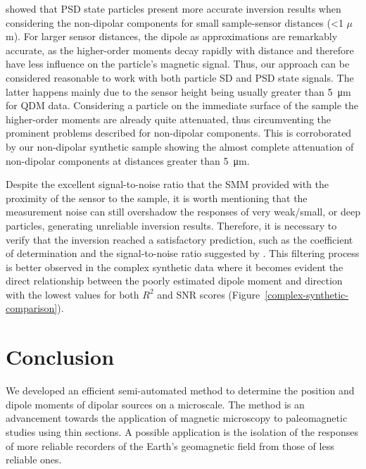 \cite{CortesOrtuno2022} showed that PSD state particles present more accurate inversion results when considering the non-dipolar components for small sample-sensor distances (\textless 1 $\mu$m). For larger sensor distances, the dipole as approximations are remarkably accurate, as the higher-order moments decay rapidly with distance and therefore have less
influence on the particle's magnetic signal.
Thus, our approach can be considered reasonable to work with both particle SD and PSD state signals.
The latter happens mainly due to the sensor height being usually greater than \qty{5}{\um} for QDM data. Considering a particle on the immediate surface of the sample the higher-order moments are already quite attenuated, thus circumventing the prominent problems described for non-dipolar components. This is corroborated by our non-dipolar synthetic sample showing the almost complete attenuation of non-dipolar components at distances greater than \qty{5}{\um}.

Despite the excellent signal-to-noise ratio that the SMM provided with the
proximity of the sensor to the sample, it is worth mentioning that the
measurement noise can still overshadow the responses of very weak/small, or
deep particles, generating unreliable inversion results.
Therefore, it is necessary to verify that the inversion reached a satisfactory prediction, such as the coefficient of determination \citep[dipolarity test, ][]{Fu2020} and the
signal-to-noise ratio suggested by \cite{CortesOrtuno2021}. This filtering process is better observed in the complex synthetic data where it becomes evident the direct relationship between the poorly estimated dipole moment and direction with the lowest values for both $R^2$ and SNR scores (Figure~\ref{complex-synthetic-comparison}).

\section{Conclusion}

We developed an efficient semi-automated method to determine the position and dipole moments of dipolar sources on a microscale.
The method is an advancement towards the application of magnetic microscopy to paleomagnetic studies using thin sections.
A possible application is the isolation of the responses of more reliable recorders of the Earth's geomagnetic field from those of less reliable ones.

